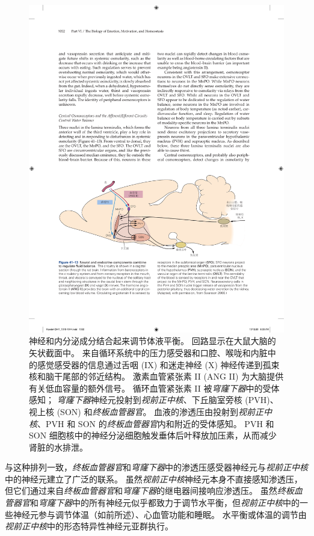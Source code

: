 \begin{figure}[htbp]
	\centering
	\includegraphics[width=0.95\linewidth]{chap41/fig_41_13}
	\caption{神经和内分泌成分结合起来调节体液平衡。
		回路显示在大鼠大脑的矢状截面中。
		来自循环系统中的压力感受器和口腔、喉咙和内脏中的感觉感受器的信息通过舌咽 (IX) 和迷走神经 (X) 神经传递到孤束核和脑干尾部的邻近结构。
		激素血管紧张素 II (ANG II) 为大脑提供有关低血容量的额外信号。
		循环血管紧张素 II 被\textit{穹窿下器}中的受体感知； 
		\textit{穹窿下器}神经元投射到\textit{视前正中核}、下丘脑室旁核 (PVH)、视上核 (SON) 和\textit{终板血管器官}。
		血液的渗透压由投射到\textit{视前正中核}、PVH 和 SON 的\textit{终板血管器官}内和附近的受体感知。
		PVH 和 SON 细胞核中的神经分泌细胞触发垂体后叶释放加压素，从而减少肾脏的水排泄\cite{swanson2000cerebral}。}
	\label{fig:41_13}
\end{figure}


与这种排列一致，\textit{终板血管器官}和\textit{穹窿下器}中的渗透压感受器神经元与\textit{视前正中核}中的神经元建立了广泛的联系。
虽然\textit{视前正中核}神经元本身不直接感知渗透压，但它们通过来自\textit{终板血管器官}和\textit{穹窿下器}的继电器间接响应渗透压。
虽然\textit{终板血管器官}和\textit{穹窿下器}中的所有神经元似乎都致力于调节水平衡，但\textit{视前正中核}中的一些神经元参与调节体温（如前所述）、心血管功能和睡眠。
水平衡或体温的调节由\textit{视前正中核}中的形态特异性神经元亚群执行。


